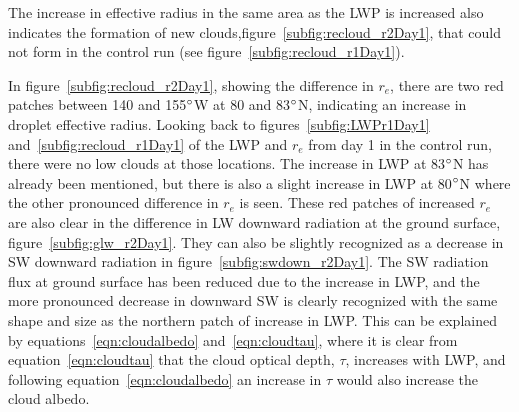 The increase in effective radius in the same area as the LWP is increased also indicates the formation of new clouds,figure~\ref{subfig:recloud_r2Day1}, that could not form in the control run (see figure~\ref{subfig:recloud_r1Day1}).

In figure~\ref{subfig:recloud_r2Day1}, showing the difference in $r_e$, there are two red patches between 140 and 155$\degree$W at 80 and 83$\degree$N, indicating an increase in droplet effective radius. Looking back to figures~\ref{subfig:LWPr1Day1} and~\ref{subfig:recloud_r1Day1} of the LWP and $r_e$ from day 1 in the control run, there were no low clouds at those locations. The increase in LWP at 83$\degree$N has already been mentioned, but there is also a slight increase in LWP at 80$\degree$N where the other pronounced difference in $r_e$ is seen. These red patches of increased $r_e$ are also clear in the difference in LW downward radiation at the ground surface, figure~\ref{subfig:glw_r2Day1}. They can also be slightly recognized as a decrease in SW downward radiation in figure~\ref{subfig:swdown_r2Day1}. The SW radiation flux at ground surface has been reduced due to the increase in LWP, and the more pronounced decrease in downward SW is clearly recognized with the same shape and size as the northern patch of increase in LWP. This can be explained by equations~\ref{eqn:cloudalbedo} and~\ref{eqn:cloudtau}, where it is clear from equation~\ref{eqn:cloudtau} that the cloud optical depth, $\tau$, increases with LWP, and following equation~\ref{eqn:cloudalbedo} an increase in $\tau$ would also increase the cloud albedo.

